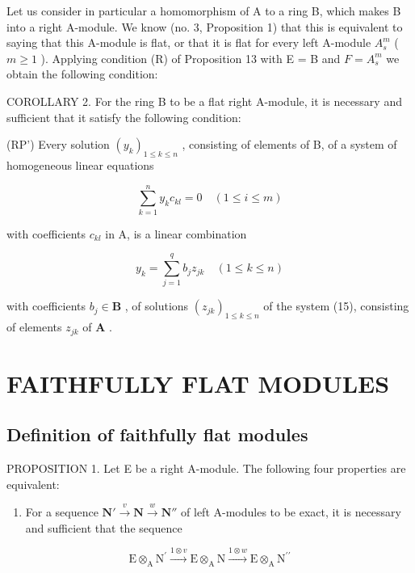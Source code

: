 Let us consider in particular a homomorphism of A to a ring B, which makes B into a right A-module. We know (no. 3, Proposition 1) that this is equivalent to saying that this A-module is flat, or that it is flat for every left A-module \(A_{s}^{m}\) ( \(m \geqslant 1\) ). Applying condition (R) of Proposition 13 with E = B and \(F = A_{s}^{m}\) we obtain the following condition:

COROLLARY 2. For the ring B to be a flat right A-module, it is necessary and sufficient that it satisfy the following condition:

(RP') Every solution \((y_{k})_{1\leqslant k\leqslant n}\) , consisting of elements of B, of a system of homogeneous linear equations

\[
\sum_ {k = 1} ^ {n} y _ {k} c _ {k l} = 0 \quad (1 \leqslant i \leqslant m)\tag{15}
\]

with coefficients \(c_{kl}\) in A, is a linear combination

\[
y _ {k} = \sum_ {j = 1} ^ {q} b _ {j} z _ {j k} \quad (1 \leqslant k \leqslant n)\tag{16}
\]

with coefficients \(b_{j} \in \mathbf{B}\) , of solutions \((z_{jk})_{1 \leqslant k \leqslant n}\) of the system (15), consisting of elements \(z_{jk}\) of \(\mathbf{A}\) .

\section{FAITHFULLY FLAT MODULES}

\subsection{Definition of faithfully flat modules}

PROPOSITION 1. Let E be a right A-module. The following four properties are equivalent:

\begin{enumerate}
\def\labelenumi{(\alph{enumi})}
\tightlist
\item
  For a sequence \(\mathbf{N}' \xrightarrow{v} \mathbf{N} \xrightarrow{w} \mathbf{N}''\) of left A-modules to be exact, it is necessary and sufficient that the sequence
\end{enumerate}

\[
\mathrm{E} \otimes_ {\mathrm{A}} \mathrm{N} ^ {\prime} \xrightarrow {1 \otimes v} \mathrm{E} \otimes_ {\mathrm{A}} \mathrm{N} \xrightarrow {1 \otimes w} \mathrm{E} \otimes_ {\mathrm{A}} \mathrm{N} ^ {\prime \prime}
\]

